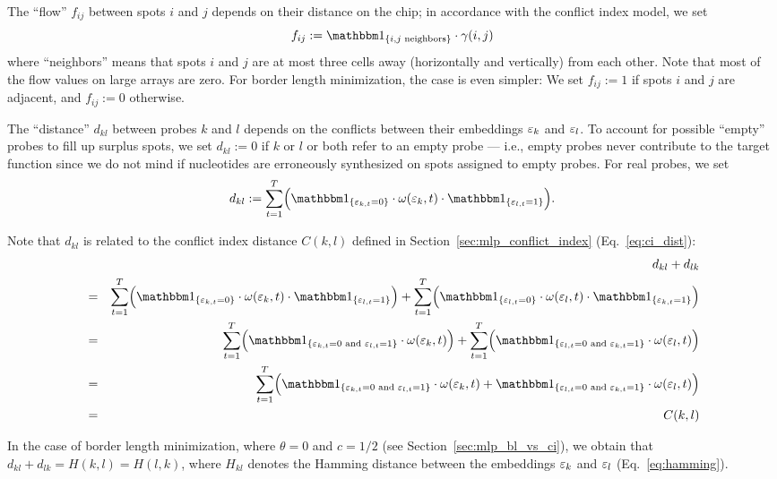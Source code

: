 The ``flow'' $f_{ij}$ between spots $i$ and $j$ depends on their distance on the
chip; in accordance with the conflict index model, we set
\begin{equation}
  f_{ij} := \Ind{i,j \text{ neighbors}} \cdot \gamma(i,j)
\end{equation}
where ``neighbors'' means that spots $i$ and $j$ are at most three cells away
(horizontally and vertically) from each other. Note that most of the flow values
on large arrays are zero. For border length minimization, the case is even
simpler: We set $f_{ij}:=1$ if spots $i$ and $j$ are adjacent, and $f_{ij}:=0$
otherwise.

The ``distance'' $d_{kl}$ between probes $k$ and $l$ depends on the conflicts
between their embeddings $\varepsilon_k$ and $\varepsilon_l$. To account for possible
``empty'' probes to fill up surplus spots, we set $d_{kl}:=0$ if $k$ or $l$ or
both refer to an empty probe --- i.e., empty probes never contribute to the
target function since we do not mind if nucleotides are erroneously synthesized
on spots assigned to empty probes. For real probes, we set
\begin{equation}
  d_{kl} := \sum_{t=1}^{T} \Bigl(
    \Ind{\eps_{k,t}=0}
    \cdot \omega(\eps_k,t)
    \cdot \Ind{\eps_{l,t}=1} \Bigr).
\end{equation}

Note that $d_{kl}$ is related to the conflict index distance $C(k,l)$ defined in
Section~\ref{sec:mlp_conflict_index} (Eq.~\ref{eq:ci_dist}):
\begin{eqnarray*}
 &   & d_{kl} + d_{lk} \\
 & = & \sum_{t=1}^{T} \Bigl( \Ind{\eps_{k,t}=0} \cdot \omega(\eps_k,t) \cdot \Ind{\eps_{l,t}=1} \Bigr)
     + \sum_{t=1}^{T} \Bigl( \Ind{\eps_{l,t}=0} \cdot \omega(\eps_l,t) \cdot \Ind{\eps_{k,t}=1} \Bigr) \\
 & = & \sum_{t=1}^{T} \Bigl( \Ind{\eps_{k,t}=0 \text{ and } \eps_{l,t}=1} \cdot \omega(\eps_k,t) \Bigr)
     + \sum_{t=1}^{T} \Bigl( \Ind{\eps_{l,t}=0 \text{ and } \eps_{k,t}=1} \cdot \omega(\eps_l,t) \Bigr) \\
 & = & \sum_{t=1}^{T} \Bigl(
                        \Ind{\eps_{k,t}=0 \text{ and } \eps_{l,t}=1} \cdot \omega(\eps_k,t) +
                        \Ind{\eps_{l,t}=0 \text{ and } \eps_{k,t}=1} \cdot \omega(\eps_l,t)
                      \Bigr) \\
 & = & C(k,l)
\end{eqnarray*}

In the case of border length minimization, where $\theta=0$ and $c=1/2$ (see
Section~\ref{sec:mlp_bl_vs_ci}), we obtain that
$d_{kl} + d_{lk} = H(k,l) = H(l,k)$, where $H_{kl}$ denotes the Hamming distance
between the embeddings $\varepsilon_k$ and $\varepsilon_l$ (Eq.~\ref{eq:hamming}).

